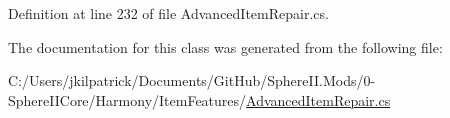 Definition at line 232 of file Advanced\+Item\+Repair.\+cs.



The documentation for this class was generated from the following file\+:\begin{DoxyCompactItemize}
\item 
C\+:/\+Users/jkilpatrick/\+Documents/\+Git\+Hub/\+Sphere\+I\+I.\+Mods/0-\/\+Sphere\+I\+I\+Core/\+Harmony/\+Item\+Features/\mbox{\hyperlink{_advanced_item_repair_8cs}{Advanced\+Item\+Repair.\+cs}}\end{DoxyCompactItemize}
